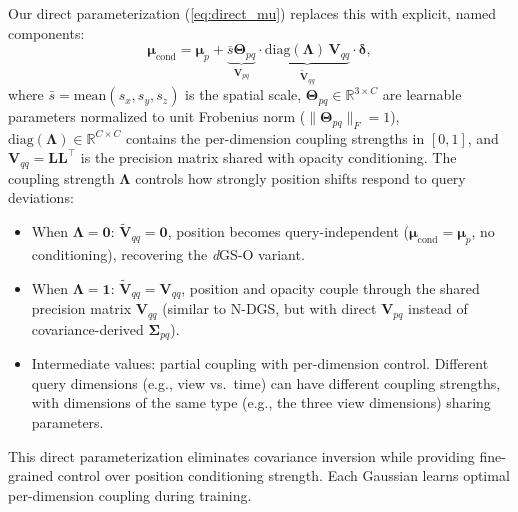 \documentclass{article}
\newcommand{\dgso}{\textit{d}GS-O\xspace}
\theoremstyle{plain}
\theoremstyle{definition}
\theoremstyle{remark}
\begin{document}
Our direct parameterization (\cref{eq:direct_mu}) replaces this with explicit, named components:
\begin{equation*}
\boldsymbol{\mu}_{\text{cond}} = \boldsymbol{\mu}_p + \underbrace{\bar{s} \boldsymbol{\Theta}_{pq}}_{\mathbf{V}_{pq}} \cdot \underbrace{\mathrm{diag}(\boldsymbol{\Lambda})\,\mathbf{V}_{qq}}_{\tilde{\mathbf{V}}_{qq}} \cdot \boldsymbol{\delta},
\end{equation*}
where $\bar{s} = \mathrm{mean}(s_x, s_y, s_z)$ is the spatial scale, $\boldsymbol{\Theta}_{pq} \in \mathbb{R}^{3 \times C}$ are learnable parameters normalized to unit Frobenius norm ($\|\boldsymbol{\Theta}_{pq}\|_F = 1$), $\mathrm{diag}(\boldsymbol{\Lambda}) \in \mathbb{R}^{C \times C}$ contains the per-dimension coupling strengths in $[0,1]$, and $\mathbf{V}_{qq} = \mathbf{L}\mathbf{L}^\top$ is the precision matrix shared with opacity conditioning. The coupling strength $\boldsymbol{\Lambda}$ controls how strongly position shifts respond to query deviations:
\begin{itemize}[leftmargin=*]
\item When $\boldsymbol{\Lambda} = \mathbf{0}$: $\tilde{\mathbf{V}}_{qq} = \mathbf{0}$, position becomes query-independent ($\boldsymbol{\mu}_{\text{cond}} = \boldsymbol{\mu}_p$, no conditioning), recovering the \dgso{} variant.
\item When $\boldsymbol{\Lambda} = \mathbf{1}$: $\tilde{\mathbf{V}}_{qq} = \mathbf{V}_{qq}$, position and opacity couple through the shared precision matrix $\mathbf{V}_{qq}$ (similar to N-DGS, but with direct $\mathbf{V}_{pq}$ instead of covariance-derived $\boldsymbol{\Sigma}_{pq}$).
\item Intermediate values: partial coupling with per-dimension control. Different query dimensions (e.g., view vs.\ time) can have different coupling strengths, with dimensions of the same type (e.g., the three view dimensions) sharing parameters.
\end{itemize}
This direct parameterization eliminates covariance inversion while providing fine-grained control over position conditioning strength. Each Gaussian learns optimal per-dimension coupling during training.
\end{document}
